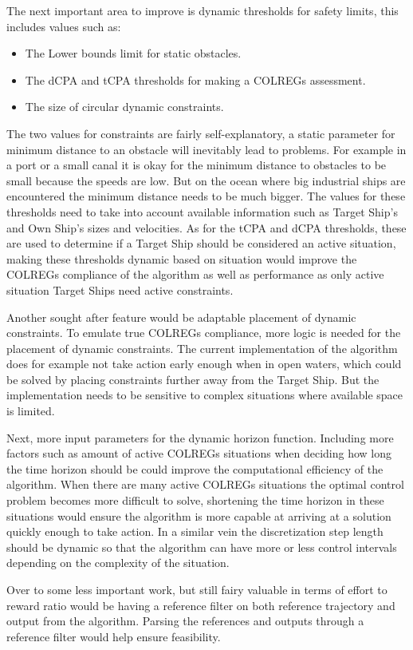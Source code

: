 The next important area to improve is dynamic thresholds for safety limits, this includes values such as:
\begin{itemize}
    \item The Lower bounds limit for static obstacles.
    \item The dCPA and tCPA thresholds for making a COLREGs assessment.
    \item The size of circular dynamic constraints.
\end{itemize}
The two values for constraints are fairly self-explanatory, a static parameter for minimum distance to an obstacle will inevitably lead to problems. For example in a
port or a small canal it is okay for the minimum distance to obstacles to be small because the speeds are low. But on the ocean where big industrial ships are encountered
the minimum distance needs to be much bigger. The values for these thresholds need to take into account available information such as Target Ship's and Own Ship's sizes and velocities.
As for the tCPA and dCPA thresholds, these are used to determine if a Target Ship should be considered an active situation, making these thresholds dynamic based on situation would improve
the COLREGs compliance of the algorithm as well as performance as only active situation Target Ships need active constraints.

Another sought after feature would be adaptable placement of dynamic constraints. To emulate true COLREGs compliance, more logic is needed for the placement of dynamic constraints. 
The current implementation of the algorithm does for example not take action early enough when in open waters, 
which could be solved by placing constraints further away from the Target Ship. But the implementation needs to be sensitive to complex situations where available space is limited.

Next, more input parameters for the dynamic horizon function. Including more factors such as amount of active COLREGs situations when deciding how long the time horizon should be
could improve the computational efficiency of the algorithm. When there are many active COLREGs situations the optimal control problem becomes more difficult to solve, shortening
the time horizon in these situations would ensure the algorithm is more capable at arriving at a solution quickly enough to take action. In a similar vein the discretization step
length should be dynamic so that the algorithm can have more or less control intervals depending on the complexity of the situation.

Over to some less important work, but still fairy valuable in terms of effort to reward ratio would be having a reference filter on both reference trajectory and output from the algorithm.
Parsing the references and outputs through a reference filter would help ensure feasibility.




\newpage